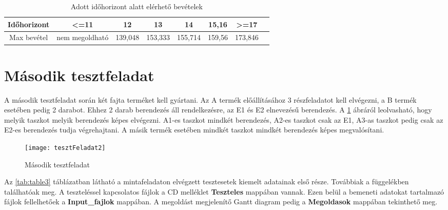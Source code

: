 \begin{table}[H]
	\begin{center}
		\caption{Adott időhorizont alatt elérhető bevételek}
  		\captionsetup[table]{skip=10pt}
    	\label{tab:table2}
		\begin{tabular}{|c|c|c|c|c|c|c|c|}
		\hline
		Időhorizont & \textless =11 & 12 & 13 & 14 & 15,16 & \textgreater =17\\
		\hline
		Max bevétel & nem megoldható & 139,048 & 153,333 & 155,714 & 159,56 & 173,846\\
		\hline
		\end{tabular}	
	\end{center}	
\end{table}

\section{Második tesztfeladat}
A második tesztfeladat során két fajta terméket kell gyártani. Az A termék előállításához 3 részfeladatot kell elvégezni, a B termék esetében pedig 2 darabot. Ehhez 2 darab berendezés áll rendelkezésre, az E1 és E2 elnevezésű berendezés. A \ref{tesztFeladat2} ábráról leolvasható, hogy melyik taszkot melyik berendezés képes elvégezni. A1-es taszkot mindkét berendezés, A2-es taszkot csak az E1, A3-as taszkot pedig csak az E2-es berendezés tudja végrehajtani. A másik termék esetében mindkét taszkot mindkét berendezés képes megvalósítani.

\begin{figure}[H]
\begin{center}
\texttt{[image: tesztFeladat2]}
\caption{Második tesztfeladat}
\label{tesztFeladat2}
\end{center}
\end{figure}

Az \ref{tab:table3} táblázatban látható a mintafeladaton elvégzett tesztesetek kiemelt adatainak első része. Továbbiak a függelékben találhatóak meg. A teszteléssel kapcsolatos fájlok a CD melléklet \textbf{Teszteles} mappában vannak. Ezen belül a bemeneti adatokat tartalmazó fájlok fellelhetőek a \textbf{Input\_fajlok} mappában. A megoldást megjelenítő Gantt diagram pedig a \textbf{Megoldasok} mappában tekinthető meg.

